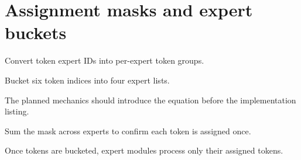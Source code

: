 \section{Assignment masks and expert buckets}
\label{sec:ch04-assignment-masks-and-expert-buckets}

Convert token expert IDs into per-expert token groups.



Bucket six token indices into four expert lists.



The planned mechanics should introduce the equation before the implementation listing.





\begin{checkpointbox}
Sum the mask across experts to confirm each token is assigned once.
\end{checkpointbox}

Once tokens are bucketed, expert modules process only their assigned tokens.
